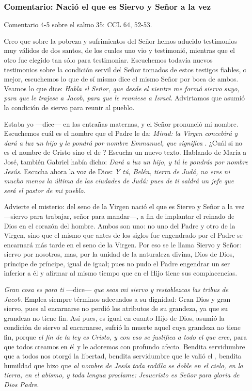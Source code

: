 \begin{body}
\begin{body}
\subsubsection{Comentario: Nació el que es Siervo y Señor a la vez}

Comentario 4-5 sobre el salmo 35: CCL 64, 52-53.

Creo que sobre la pobreza y sufrimientos del Señor hemos aducido testimonios muy válidos de dos santos, de los cuales uno vio y testimonió, mientras que el otro fue elegido tan sólo para testimoniar. Escuchemos todavía nuevos testimonios sobre la condición servil del Señor tomados de estos testigos fiables, o mejor, escuchemos lo que de sí mismo dice el mismo Señor por boca de ambos. Veamos lo que dice: \emph{Habla el Señor, que desde el vientre me formó siervo suyo, para que le trajese a Jacob, para que le reuniese a Israel}. Advirtamos que asumió la condición de siervo para reunir al pueblo.

Estaba yo ---dice--- en las entrañas maternas, y el Señor pronunció mi nombre. Escuchemos cuál es el nombre que el Padre le da: \emph{Mirad: la Virgen concebirá y dará a luz un hijo y le pondrá por nombre Emmanuel, que significa }. ¿Cuál si no es el nombre de Cristo sino el de ? Escucha un nuevo texto. Hablando de María a José, también Gabriel había dicho: \emph{Dará a luz un hijo, y tú le pondrás por nombre Jesús}. Escucha ahora la voz de Dios: \emph{Y tú, Belén, tierra de Judá, no eres ni mucho menos la última de las ciudades de Judá: pues de ti saldrá un jefe que será el pastor de mi pueblo}.

Advierte el misterio: del seno de la Virgen nació el que es Siervo y Señor a la vez ---siervo para trabajar, señor para mandar---, a fin de implantar el reinado de Dios en el corazón del hombre. Ambos son uno: no uno del Padre y otro de la Virgen, sino que el mismo que antes de los siglos fue engendrado por el Padre se encarnará más tarde en el seno de la Virgen. Por eso se le llama Siervo y Señor: siervo por nosotros, mas, por la unidad de la naturaleza divina, Dios de Dios, príncipe de príncipe, igual de igual; pues no pudo el Padre engendrar un ser inferior a él y afirmar al mismo tiempo que en el Hijo tiene sus complacencias.

\emph{Gran cosa es para ti} ---dice--- \emph{que seas mi siervo y restablezcas las tribus de Jacob}. Emplea siempre términos adecuados a su dignidad: Gran Dios y gran siervo, pues al encarnarse no perdió los atributos de su grandeza, ya que su grandeza no tiene fin. Así pues, es igual en cuanto Hijo de Dios, asumió la condición de siervo al encarnarse, sufrió la muerte aquel cuya grandeza no tiene fin, porque \emph{el fin de la ley es Cristo, y con eso se justifica a todo el que cree,} para que todos creamos en él y le adoremos con profundo afecto. Bendita servidumbre que a todos nos otorgó la libertad, bendita servidumbre que le valió el , bendita humildad que hizo que \emph{al nombre de Jesús toda rodilla se doble en el cielo, en la tierra, en el abismo, y toda lengua proclame: Jesucristo es Señor para gloria de Dios Padre}.


\end{body}
\end{body}

